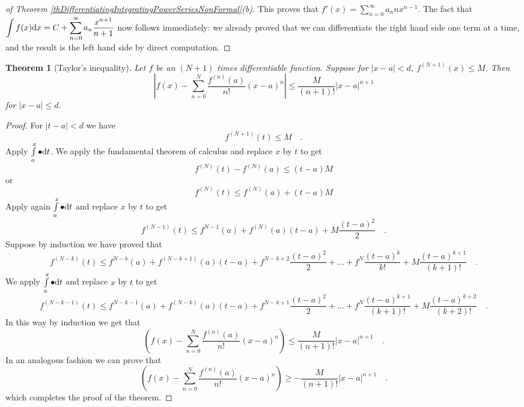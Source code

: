 \documentclass[12pt]{book}
\newtheorem{theorem}{Theorem}[section]
\begin{document}
\begin{proof}[ of Theorem \ref{thDifferentiatingIntegratingPowerSeriesNonFormal}(b)]
This proves that $f'(x)=\sum\limits_{n=0}^\infty a_n n x^{n-1}$. The fact that $\displaystyle\int f(x){\normalfont \text{d}} x= C+\sum\limits_{n=0}^\infty a_n\frac{x^{n+1}}{n+1} $ now follows immediately: we already proved that we can differentiate the right hand side one term at a time, and the result is the left hand side by direct computation.
\end{proof}

\begin{theorem}[Taylor's inequality] Let $f$ be an $(N+1)$ times differentiable function. Suppose for $|x-a|<d$, $f^{(N+1)}(x)\leq M$. Then
\[
\left|f(x)-\sum\limits_{n=0}^N \frac{f^{(n)}(a)}{n!}(x-a)^n\right| \leq \frac{M}{(n+1)!} |x-a|^{n+1}
\]
for $|x-a|\leq d$.
\end{theorem}
\begin{proof}
For $|t-a|< d$ we have
\[
f^{(N+1)}(t) \leq  M\quad.
\]
Apply $\int\limits_{a}^{x} \bullet {\normalfont \text{d}} t $. We apply the fundamental theorem of calculus and replace $x$ by $t$ to get
\[
f^{(N)}(t)-f^{(N)}(a)\leq (t-a) M
\]
or
\[
f^{(N)}(t)\leq f^{(N)}(a)+(t-a) M
\]
Apply again $\int\limits_{a}^{x} \bullet {\normalfont \text{d}} t $ and replace $x$ by $t$ to get
\[
f^{(N-1)}(t)\leq f^{N-1}(a) +f^{(N)}(a)(t-a)+ M\frac{(t-a)^2}2\quad .
\]
Suppose by induction we have proved that
\[
f^{(N-k)}(t)\leq f^{N-k}(a) +f^{(N-k+1)}(a)(t-a)+ f^{N-k+2}\frac{(t-a)^2}2+\dots +f^{N}\frac{(t-a)^{k}}{k!}+ M\frac{(t-a)^{k+1}}{(k+1)!} \quad .
\]
We apply $\int\limits_{a}^{x} \bullet {\normalfont \text{d}} t $ and replace $x$ by $t$ to get
\[
f^{(N-k-1)}(t)\leq f^{N-k-1}(a) +f^{(N-k)}(a)(t-a)+ f^{N-k+1}\frac{(t-a)^2}2+\dots +f^{N}\frac{(t-a)^{k+1}}{(k+1)!}+ M\frac{(t-a)^{k+2}}{(k+2)!} \quad .
\]
In this way by induction we get that
\[
\left(f(x)-\sum\limits_{n=0}^N \frac{f^{(n)}(a)}{n!}(x-a)^n\right)\leq \frac{M}{(n+1)!} |x-a|^{n+1} \quad.
\]
In an analogous fashion we can prove that
\[
\left(f(x)-\sum\limits_{n=0}^N \frac{f^{(n)}(a)}{n!}(x-a)^n\right)\geq -\frac{M}{(n+1)!} |x-a|^{n+1} \quad.
\]
which completes the proof of the theorem.
\end{proof}



\printindex
\end{document}
